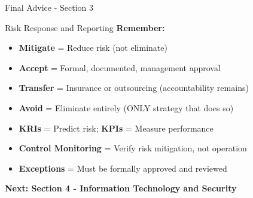 \documentclass{beamer}
\begin{document}
	\begin{frame}{Final Advice - Section 3}
		\begin{block}{Risk Response and Reporting}
			\centering
			\vspace{0.3cm}
			\textbf{Remember:}
			\begin{itemize}
				\item \textbf{Mitigate} = Reduce risk (not eliminate)
				\item \textbf{Accept} = Formal, documented, management approval
				\item \textbf{Transfer} = Insurance or outsourcing (accountability remains)
				\item \textbf{Avoid} = Eliminate entirely (ONLY strategy that does so)
				\item \textbf{KRIs} = Predict risk; \textbf{KPIs} = Measure performance
				\item \textbf{Control Monitoring} = Verify risk mitigation, not operation
				\item \textbf{Exceptions} = Must be formally approved and reviewed
			\end{itemize}
			\vspace{0.5cm}
			\textbf{Next: Section 4 - Information Technology and Security}
		\end{block}
	\end{frame}
	
	
\end{document}
